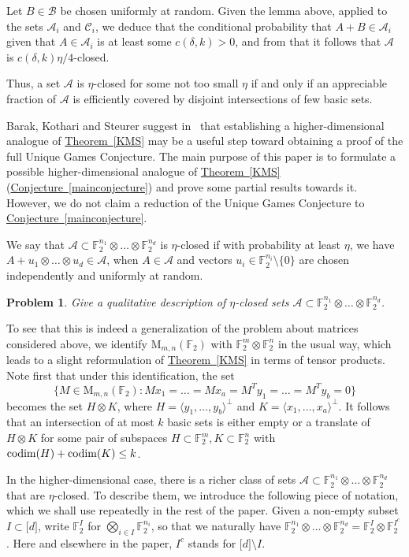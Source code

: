 \documentclass[11pt]{article}
\numberwithin{equation}{section}
\theoremstyle{definition}
\theoremstyle{plain}
\newcommand{\expref}[2]{\hyperref[#2]{#1~\ref{#2}}}
\newtheorem{problem}[theorem]{Problem}
\newcommand\F{\mathbb{F}}
\renewcommand\d{\delta}
\newcommand \cA{\mathcal A}
\newcommand \cB{\mathcal B}
\newcommand \cC{\mathcal C}
\newcommand \codim{{\rm codim}}
\newcommand \mn{\mathrm{M}_{m,n}(\F_2)}
\newcommand \s{\subset}
\begin{document}
Let $B\in\cB$ be chosen uniformly at random. Given the lemma above, applied to the sets $\cA_i$ and $\cC_i$, we deduce that the conditional probability that $A+B\in\cA_i$ given that $A\in\cA_i$ is at least some $c(\d,k)>0$, and from that it follows that $\cA$ is  $c(\d,k)\eta/4$-closed.

Thus, a set $\cA$ is $\eta$-closed for some not too small $\eta$ if and only if an appreciable fraction of $\cA$ is efficiently covered by disjoint intersections of few basic sets.

\medskip
%
Barak, Kothari and Steurer suggest in~\cite{barak} that establishing
a higher-dimensional analogue of \expref{Theorem}{KMS} may be a
useful step toward obtaining a proof of the full Unique Games Conjecture.
%
The main purpose of this paper is to formulate a possible
higher-dimensional analogue of \expref{Theorem}{KMS}
(\expref{Conjecture}{mainconjecture}) 
%
and prove some partial results towards it.
However, we do not claim a reduction of the Unique Games Conjecture
to \expref{Conjecture}{mainconjecture}.

We say that $\cA\s \F_2^{n_1}\otimes \dots \otimes \F_2^{n_d}$ is $\eta$-closed if with probability at least $\eta$, we have $A+u_1\otimes \dots \otimes u_d\in \cA$, when $A\in \cA$ and vectors $u_i\in \F_2^{n_i}\setminus \{0\}$ are chosen independently and uniformly at random. 

\begin{problem} \label{tensorproblem}
	Give a qualitative description of $\eta$-closed sets $\cA\s \F_2^{n_1}\otimes \dots \otimes \F_2^{n_d}$.
\end{problem}

To see that this is indeed a generalization of the problem about matrices considered above, we identify $\mn$ with $\F_2^m \otimes \F_2^n$ in the usual way, which leads to a slight reformulation of \expref{Theorem}{KMS} in terms of tensor products. Note first that under this identification, the set
\[
  \{M\in \mn:Mx_1=\dots=Mx_a=M^Ty_1=\dots=M^Ty_b=0\}
\]
becomes the set $H\otimes K$, where $H=\langle y_1,\dots,y_b\rangle^{\perp}$ and $K=\langle x_1,\dots,x_a\rangle^{\perp}$. It follows that an intersection of at most $k$ basic sets is either empty or a translate of $H\otimes K$ for some pair of subspaces $H\s \F_2^m,K\s \F_2^n$ with $\codim(H)+\codim(K)\leq k$.

In the higher-dimensional case, there is a richer class of sets $\cA\s \F_2^{n_1}\otimes \dots \otimes \F_2^{n_d}$ that are $\eta$-closed. To describe them, we introduce the following piece of notation, which we shall use repeatedly in the rest of the paper. Given a non-empty subset $I\s \lbrack d\rbrack$, write $\F_2^{I}$ for $\bigotimes_{i\in I} \F_2^{n_i}$, so that we naturally have $\F_2^{n_1}\otimes \dots \otimes \F_2^{n_d}=\F_2^{I}\otimes \F_2^{I^c}$. Here and elsewhere in the paper, $I^c$ stands for $\lbrack d\rbrack \setminus I$.
\end{document}
